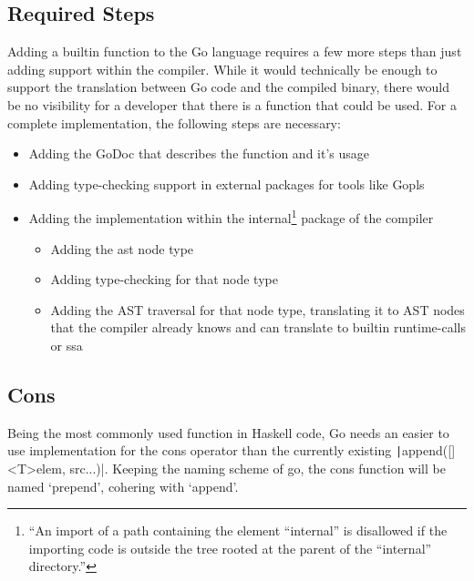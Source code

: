 \subsection{Required Steps}

Adding a builtin function to the Go language requires a few more steps than just adding support
within the compiler. While it would technically be enough to support the translation between
Go code and the compiled binary, there would be no visibility for a developer that there is a
function that could be used.
For a complete implementation, the following steps are necessary:
\begin{itemize}
    \item Adding the GoDoc\cite{godoc} that describes the function and it's usage
    \item Adding type-checking support in external packages for tools like Gopls\cite{gopls}
    \item Adding the implementation within the internal\footnote{
            ``An import of
            a path containing the element “internal” is disallowed if the importing code is
            outside the tree rooted at the parent of the “internal” directory.''\cite{internal-packages}
        }
        package of the compiler
        \begin{itemize}
            \item Adding the \gls{ast} node type
            \item Adding type-checking for that node type
            \item Adding the AST traversal for that node type, translating it
                to AST nodes that the compiler already knows and can translate
                to builtin runtime-calls or \gls{ssa}
        \end{itemize}
\end{itemize}

\subsection{Cons}

Being the most commonly used function in Haskell code, Go needs an easier to use implementation for the cons operator
than the currently existing \texttt|append([]<T>{elem}, src...)|. Keeping the naming scheme of go, the cons
function will be named `prepend', cohering with `append'.

